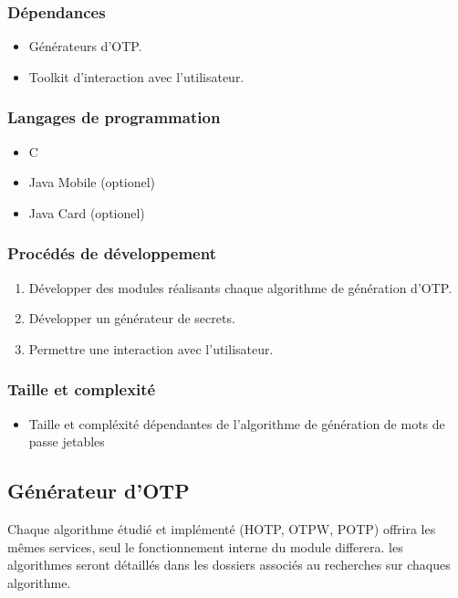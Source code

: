 \documentclass{"../../res/univ-projet"}
\begin{document}
    \subsubsection{Dépendances}
        \begin{itemize}
            \item Générateurs d'OTP.
            \item Toolkit d'interaction avec l'utilisateur.
        \end{itemize}

    \subsubsection{Langages de programmation}
    \begin{itemize}
        \item C
        \item Java Mobile (optionel)
        \item Java Card (optionel)
    \end{itemize}

    \subsubsection{Procédés de développement}
    \begin{enumerate}
        \item Développer des modules réalisants chaque algorithme de génération
            d'OTP.
        \item Développer un générateur de secrets.
        \item Permettre une interaction avec l'utilisateur.
    \end{enumerate}

    \subsubsection{Taille et complexité}
    \begin{itemize}
        \item Taille et compléxité dépendantes de l'algorithme de génération
            de mots de passe jetables
    \end{itemize}

\subsection{Générateur d'OTP}
    Chaque algorithme \'etudi\'e et impl\'ement\'e (HOTP, OTPW, POTP) offrira les
    mêmes services, seul le fonctionnement interne du module differera.
    les algorithmes seront détaillés dans les dossiers associés au recherches sur 
    chaques algorithme.
\end{document}
